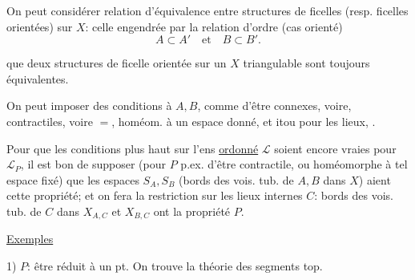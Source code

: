 On peut considérer relation d'équivalence entre structures de ficelles  (resp. ficelles orientées) sur $X$:  celle engendrée par la relation d'ordre (cas orienté)
\[
A\subset A'\quad\text{et}\quad B\subset B'.
\]


 que deux structures de ficelle orientée sur un $X$ triangulable sont toujours équivalentes.



On peut imposer des conditions à $A,B$, comme d'être connexes, voire, contractiles, voire $=$, homéom. à un espace donné, et itou pour les lieux, .

Pour que les conditions plus haut sur l'ens \uline{ordonné} $\mathcal L$ soient encore vraies pour $\mathcal L_P$, il est bon de   supposer  (pour $P$  p.ex. d'être contractile, ou homéomorphe à tel espace fixé) que les espaces $S_A,S_B$ (bords des vois. tub. de $A,B$ dans $X$) aient cette propriété; et  on fera la restriction  sur les lieux internes $C$:  bords des vois. tub. de $C$ dans $X_{A,C}$ et $X_{B,C}$ ont la propriété $P$.

\uline{Exemples}

1) $P$: être  réduit à un pt. On trouve la théorie des segments top. 



